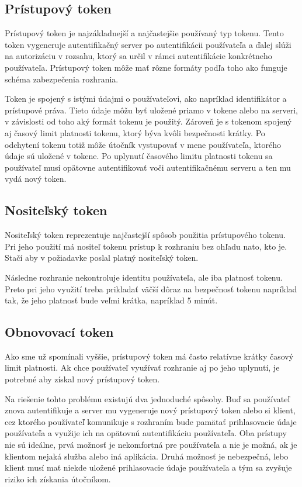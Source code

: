\subsection{Prístupový token}

Prístupový token \cite{access_token} je najzákladnejší a najčastejšie používaný typ tokenu. Tento token vygeneruje autentifikačný server po autentifikácii používateľa a ďalej slúži na autorizáciu v rozsahu, ktorý sa určil v rámci autentifikácie konkrétneho používateľa. Prístupový token môže mať rôzne formáty podľa toho ako funguje schéma zabezpečenia rozhrania.

Token je spojený s istými údajmi o používateľovi, ako napríklad identifikátor a prístupové práva. Tieto údaje môžu byť uložené priamo v tokene alebo na serveri, v závislosti od toho aký formát tokenu je použitý. Zároveň je s tokenom spojený aj časový limit platnosti tokenu, ktorý býva kvôli bezpečnosti krátky. Po odchytení tokenu totiž môže útočník vystupovať v mene používateľa, ktorého údaje sú uložené v tokene. Po uplynutí časového limitu platnosti tokenu sa používateľ musí opätovne autentifikovať voči autentifikačnému serveru a ten mu vydá nový token.


\subsection{Nositeľský token}

Nositeľský token reprezentuje najčastejší spôsob použitia prístupového tokenu. Pri jeho použití má nositeľ tokenu prístup k rozhraniu bez ohľadu nato, kto je. Stačí aby v požiadavke poslal platný nositeľský token.

Následne rozhranie nekontroluje identitu používateľa, ale iba platnosť tokenu. Preto pri jeho využití treba prikladať väčší dôraz na bezpečnosť tokenu napríklad tak, že jeho platnosť bude veľmi krátka, napríklad 5 minút.


\subsection{Obnovovací token}

Ako sme už spomínali vyššie, prístupový token má často relatívne krátky časový limit platnosti. Ak chce používateľ využívať rozhranie aj po jeho uplynutí, je potrebné aby získal nový prístupový token.

Na riešenie tohto problému existujú dva jednoduché spôsoby. Buď sa používateľ znova autentifikuje a server mu vygeneruje nový prístupový token alebo si klient, cez ktorého používateľ komunikuje s rozhraním bude pamätať prihlasovacie údaje používateľa a využije ich na opätovnú autentifikáciu používateľa. Oba prístupy nie sú ideálne, prvá možnosť je nekomfortná pre používateľa a nie je možná, ak je klientom nejaká služba alebo iná aplikácia. Druhá možnosť je nebezpečná, lebo klient musí mať niekde uložené prihlasovacie údaje používateľa a tým sa zvyšuje riziko ich získania útočníkom.


